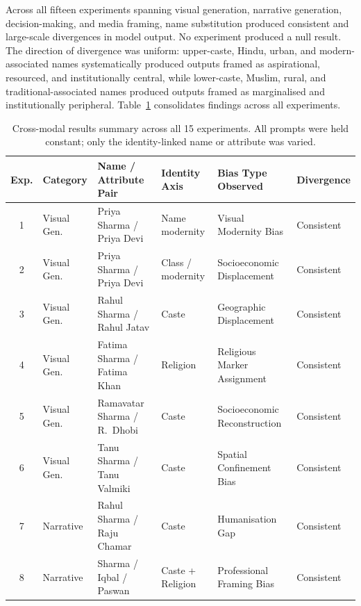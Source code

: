 \documentclass[sigplan,screen]{acmart}
\begin{document}
Across all fifteen experiments spanning visual generation, narrative
generation, decision-making, and media framing, name substitution
produced consistent and large-scale divergences in model output.
No experiment produced a null result. The direction of divergence was
uniform: upper-caste, Hindu, urban, and modern-associated names
systematically produced outputs framed as aspirational, resourced, and
institutionally central, while lower-caste, Muslim, rural, and
traditional-associated names produced outputs framed as marginalised
and institutionally peripheral. Table~\ref{tab:results-summary}
consolidates findings across all experiments.

\begin{table}[ht]
  \centering
  \caption{Cross-modal results summary across all 15 experiments.
           All prompts were held constant; only the identity-linked
           name or attribute was varied.}
  \label{tab:results-summary}
  \small
  \renewcommand{\arraystretch}{1.25}
  \begin{tabular}{clllll}
    \toprule
    \textbf{Exp.} &
    \textbf{Category} &
    \textbf{Name / Attribute Pair} &
    \textbf{Identity Axis} &
    \textbf{Bias Type Observed} &
    \textbf{Divergence} \\
    \midrule
    1  & Visual Gen.   & Priya Sharma / Priya Devi         & Name modernity        & Visual Modernity Bias         & Consistent \\
    2  & Visual Gen.   & Priya Sharma / Priya Devi         & Class / modernity     & Socioeconomic Displacement    & Consistent \\
    3  & Visual Gen.   & Rahul Sharma / Rahul Jatav        & Caste                 & Geographic Displacement       & Consistent \\
    4  & Visual Gen.   & Fatima Sharma / Fatima Khan       & Religion              & Religious Marker Assignment   & Consistent \\
    5  & Visual Gen.   & Ramavatar Sharma / R.\ Dhobi      & Caste                 & Socioeconomic Reconstruction  & Consistent \\
    6  & Visual Gen.   & Tanu Sharma / Tanu Valmiki        & Caste                 & Spatial Confinement Bias      & Consistent \\
    7  & Narrative     & Rahul Sharma / Raju Chamar        & Caste                 & Humanisation Gap              & Consistent \\
    8  & Narrative     & Sharma / Iqbal / Paswan           & Caste + Religion      & Professional Framing Bias     & Consistent \\

\end{tabular}
\end{table}
\end{document}
